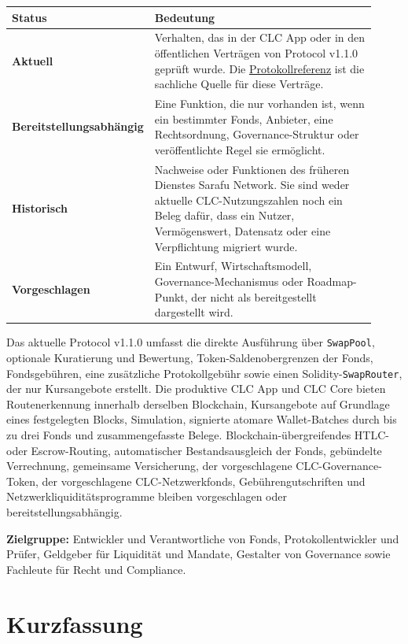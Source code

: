 \documentclass[11pt]{article}
\begin{document}
\begin{longtable}{P{0.30\linewidth} P{0.62\linewidth}}
\toprule
Status & Bedeutung \\
\midrule
\endhead
\textbf{Aktuell} & Verhalten, das in der CLC App oder in den öffentlichen Verträgen von Protocol v1.1.0 geprüft wurde. Die \href{https://docs.cosmolocal.credit/de/protocol/overview}{Protokollreferenz} ist die sachliche Quelle für diese Verträge. \\
\textbf{Bereitstellungsabhängig} & Eine Funktion, die nur vorhanden ist, wenn ein bestimmter Fonds, Anbieter, eine Rechtsordnung, Governance-Struktur oder veröffentlichte Regel sie ermöglicht. \\
\textbf{Historisch} & Nachweise oder Funktionen des früheren Dienstes Sarafu Network. Sie sind weder aktuelle CLC-Nutzungszahlen noch ein Beleg dafür, dass ein Nutzer, Vermögenswert, Datensatz oder eine Verpflichtung migriert wurde. \\
\textbf{Vorgeschlagen} & Ein Entwurf, Wirtschaftsmodell, Governance-Mechanismus oder Roadmap-Punkt, der nicht als bereitgestellt dargestellt wird. \\
\bottomrule
\end{longtable}

Das aktuelle Protocol v1.1.0 umfasst die direkte Ausführung über \texttt{SwapPool}, optionale Kuratierung und Bewertung, Token-Saldenobergrenzen der Fonds, Fondsgebühren, eine zusätzliche Protokollgebühr sowie einen Solidity-\texttt{SwapRouter}, der nur Kursangebote erstellt. Die produktive CLC App und CLC Core bieten Routenerkennung innerhalb derselben Blockchain, Kursangebote auf Grundlage eines festgelegten Blocks, Simulation, signierte atomare Wallet-Batches durch bis zu drei Fonds und zusammengefasste Belege. Blockchain-übergreifendes HTLC- oder Escrow-Routing, automatischer Bestandsausgleich der Fonds, gebündelte Verrechnung, gemeinsame Versicherung, der vorgeschlagene CLC-Governance-Token, der vorgeschlagene CLC-Netzwerkfonds, Gebührengutschriften und Netzwerkliquiditätsprogramme bleiben vorgeschlagen oder bereitstellungsabhängig.

\textbf{Zielgruppe:} Entwickler und Verantwortliche von Fonds, Protokollentwickler und Prüfer, Geldgeber für Liquidität und Mandate, Gestalter von Governance sowie Fachleute für Recht und Compliance.

\section*{Kurzfassung}
\end{document}
